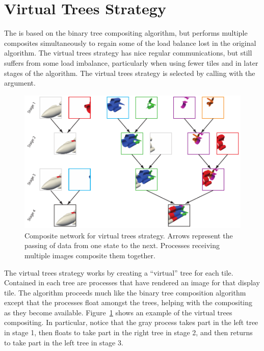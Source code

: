 \section{Virtual Trees Strategy}
\label{sec:Strategies:Vertial_Trees}


The  is based on the binary tree
compositing algorithm, but performs multiple composites simultaneously to
regain some of the load balance lost in the original algorithm.  The
virtual trees strategy has nice regular communications, but still suffers
from some load imbalance, particularly when using fewer tiles and in later
stages of the algorithm.  The virtual trees strategy is selected by calling
 with the  argument.

\begin{figure}
  \centering
  \includegraphics{images/VTrees}
  \caption[Virtual trees composite network.]{Composite network for virtual
    trees strategy.  Arrows represent the passing of data from one state to
    the next.  Processes receiving multiple images composite them
    together.}
  \label{fig:VTreesComposite}
\end{figure}

The virtual trees strategy works by creating a ``virtual'' tree for each
tile.  Contained in each tree are processes that have rendered an image for
that display tile.  The algorithm proceeds much like the binary tree
composition algorithm except that the processes float amongst the trees,
helping with the compositing as they become available.
Figure~\ref{fig:VTreesComposite} shows an example of the virtual trees
compositing.  In particular, notice that the gray process takes part in the
left tree in stage 1, then floats to take part in the right tree in stage
2, and then returns to take part in the left tree in stage 3.

